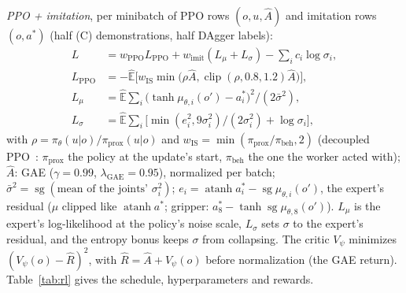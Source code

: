 \documentclass[conference]{IEEEtran}
\newcommand{\sg}{\operatorname{sg}}
\begin{document}
\emph{PPO + imitation}, per minibatch of PPO rows $(o,u,\hat A)$ and imitation rows $(o,a^*)$ (half (C)
demonstrations, half DAgger labels):
\begin{equation}
\begin{aligned}
L&=w_{\text{PPO}}L_{\text{PPO}}+w_{\text{imit}}(L_\mu+L_\sigma)-\textstyle\sum_ic_i\log\sigma_i,\\
L_{\text{PPO}}&=-\hat{\mathbb E}\big[w_{\text{IS}}\min\big(\rho\hat A,\operatorname{clip}(\rho,0.8,1.2)\hat A\big)\big],\\
L_\mu&=\hat{\mathbb E}\textstyle\sum_i\big(\tanh\mu_{\theta,i}(o')-a^*_i\big)^2/(2\bar\sigma^2),\\
L_\sigma&=\hat{\mathbb E}\textstyle\sum_i\big[\min(e_i^2,9\sigma_i^2)/(2\sigma_i^2)+\log\sigma_i\big],
\end{aligned}
\end{equation}
with $\rho=\pi_\theta(u|o)/\pi_{\text{prox}}(u|o)$ and $w_{\text{IS}}=\min(\pi_{\text{prox}}/\pi_{\text{beh}},2)$
(decoupled PPO~\cite{hilton2022batch}: $\pi_{\text{prox}}$ the policy at the update's start, $\pi_{\text{beh}}$ the one
the worker acted with); $\hat A$: GAE ($\gamma=0.99$, $\lambda_{\text{GAE}}=0.95$), normalized per batch;
$\bar\sigma^2=\sg(\text{mean of the joints' }\sigma_i^2)$; $e_i=\operatorname{atanh}a^*_i-\sg\mu_{\theta,i}(o')$, the
expert's residual ($\mu$ clipped like $\operatorname{atanh}a^*$; gripper:
$a^*_8-\tanh\sg\mu_{\theta,8}(o')$). $L_\mu$ is the expert's log-likelihood at the policy's noise scale, $L_\sigma$
sets $\sigma$ to the expert's residual, and the entropy bonus keeps $\sigma$ from collapsing. The critic $V_\psi$
minimizes $(V_\psi(o)-\hat R)^2$, with $\hat R=\hat A+V_\psi(o)$ before normalization (the GAE return).
Table~\ref{tab:rl} gives the schedule, hyperparameters and rewards.
\end{document}
